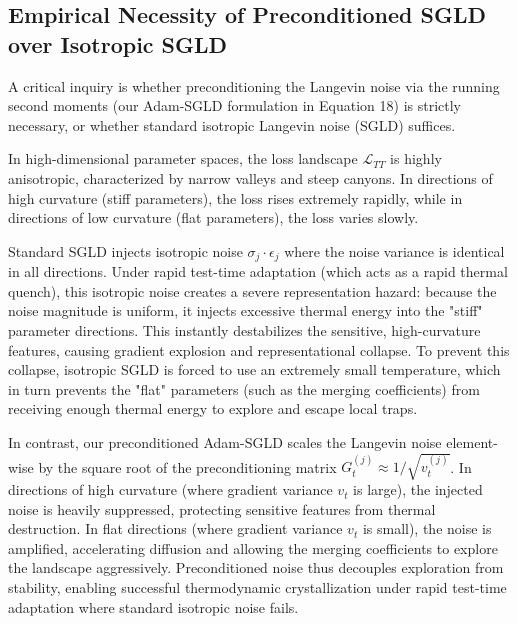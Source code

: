 \documentclass{article}
\theoremstyle{plain}
\theoremstyle{definition}
\theoremstyle{remark}
\begin{document}
\subsection{Empirical Necessity of Preconditioned SGLD over Isotropic SGLD}
A critical inquiry is whether preconditioning the Langevin noise via the running second moments (our Adam-SGLD formulation in Equation 18) is strictly necessary, or whether standard isotropic Langevin noise (SGLD) suffices.

In high-dimensional parameter spaces, the loss landscape $\mathcal{L}_{TT}$ is highly anisotropic, characterized by narrow valleys and steep canyons. In directions of high curvature (stiff parameters), the loss rises extremely rapidly, while in directions of low curvature (flat parameters), the loss varies slowly. 

Standard SGLD injects isotropic noise $\sigma_j \cdot \epsilon_j$ where the noise variance is identical in all directions. Under rapid test-time adaptation (which acts as a rapid thermal quench), this isotropic noise creates a severe representation hazard: because the noise magnitude is uniform, it injects excessive thermal energy into the "stiff" parameter directions. This instantly destabilizes the sensitive, high-curvature features, causing gradient explosion and representational collapse. To prevent this collapse, isotropic SGLD is forced to use an extremely small temperature, which in turn prevents the "flat" parameters (such as the merging coefficients) from receiving enough thermal energy to explore and escape local traps.

In contrast, our preconditioned Adam-SGLD scales the Langevin noise element-wise by the square root of the preconditioning matrix $G_t^{(j)} \approx 1/\sqrt{v_t^{(j)}}$. In directions of high curvature (where gradient variance $v_t$ is large), the injected noise is heavily suppressed, protecting sensitive features from thermal destruction. In flat directions (where gradient variance $v_t$ is small), the noise is amplified, accelerating diffusion and allowing the merging coefficients to explore the landscape aggressively. Preconditioned noise thus decouples exploration from stability, enabling successful thermodynamic crystallization under rapid test-time adaptation where standard isotropic noise fails.
\end{document}
